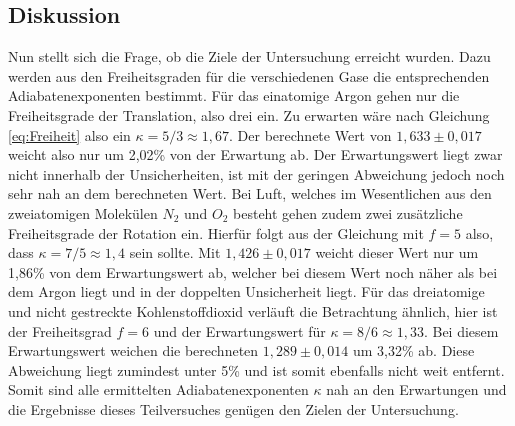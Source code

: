	\subsection{Diskussion}
	
		Nun stellt sich die Frage, ob die Ziele der Untersuchung erreicht wurden.
		Dazu werden aus den Freiheitsgraden für die verschiedenen Gase die entsprechenden Adiabatenexponenten bestimmt.
		Für das einatomige Argon gehen nur die Freiheitsgrade der Translation, also drei ein.
		Zu erwarten wäre nach Gleichung \ref{eq:Freiheit} also ein $\kappa = 5/3 \approx 1,67$.
		Der berechnete Wert von $1,633\pm 0,017$ weicht also nur um 2,02\% von der Erwartung ab.
		Der Erwartungswert liegt zwar nicht innerhalb der Unsicherheiten, ist mit der geringen Abweichung jedoch noch sehr nah an dem berechneten Wert.
		Bei Luft, welches im Wesentlichen aus den zweiatomigen Molekülen $N_2$ und $O_2$ besteht gehen zudem zwei zusätzliche Freiheitsgrade der Rotation ein. 
		Hierfür folgt aus der Gleichung mit $f = 5$ also, dass $\kappa = 7/5 \approx 1,4$ sein sollte.
		Mit $1,426\pm 0,017$ weicht dieser Wert nur um 1,86\% von dem Erwartungswert ab, welcher bei diesem Wert noch näher als bei dem Argon liegt und in der doppelten Unsicherheit liegt.
		Für das dreiatomige und nicht gestreckte Kohlenstoffdioxid verläuft die Betrachtung ähnlich, hier ist der Freiheitsgrad $f = 6$ und der Erwartungswert für $\kappa = 8/6 \approx 1,33$.
		Bei diesem Erwartungswert weichen die berechneten $1,289\pm 0,014$ um 3,32\% ab.
		Diese Abweichung liegt zumindest unter 5\% und ist somit ebenfalls nicht weit entfernt.
		Somit sind alle ermittelten Adiabatenexponenten $\kappa$ nah an den Erwartungen und die Ergebnisse dieses Teilversuches genügen den Zielen der Untersuchung.

